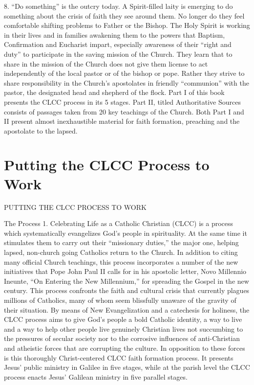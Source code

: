 \documentclass[oneside]{book}
\begin{document}
8. ``Do something'' is the outcry today. A Spirit-filled laity is emerging to do
something about the crisis of faith they see around them. No longer do they feel
comfortable shifting problems to Father or the Bishop. The Holy Spirit is
working in their lives and in families awakening them to the powers that
Baptism, Confirmation and Eucharist impart, especially awareness of their
``right and duty'' to participate in the saving mission of the Church. They
learn that to share in the mission of the Church does not give them license to
act independently of the local pastor or of the bishop or pope. Rather they
strive to share responsibility in the Church's apostolates in friendly
``communion'' with the pastor, the designated head and shepherd of the flock.
Part I of this book presents the CLCC process in its 5 stages. Part II, titled
Authoritative Sources consists of passages taken from 20 key teachings of the
Church. Both Part I and II present almost inexhaustible material for faith
formation, preaching and the apostolate to the lapsed.


\chapter{Putting the CLCC Process to Work}

PUTTING THE CLCC PROCESS TO WORK

The Process
1. Celebrating Life as a Catholic Christian (CLCC) is a process which
systematically evangelizes God's people in spirituality. At the same time it
stimulates them to carry out their ``missionary duties,'' the major one, helping
lapsed, non-church going Catholics return to the Church. In addition to citing
many official Church teachings, this process incorporates a number of the new
initiatives that Pope John Paul II calls for in his apostolic letter, Novo
Millennio Ineunte, ``On Entering the New Millennium,'' for spreading the Gospel
in the new century.
This process confronts the faith and cultural crisis that currently plagues
millions of Catholics, many of whom seem blissfully unaware of the gravity of
their situation.
By means of New Evangelization and a catechesis for holiness, the CLCC process
aims to give God's people a bold Catholic identity, a way to live and a way to
help other people live genuinely Christian lives not succumbing to the pressures
of secular society nor to the corrosive influences of anti-Christian and
atheistic forces that are corrupting the culture. In opposition to these forces
is this thoroughly Christ-centered CLCC faith formation process. It presents
Jesus' public ministry in Galilee in five stages, while at the parish level the
CLCC process enacts Jesus' Galilean ministry in five parallel stages.
\end{document}
